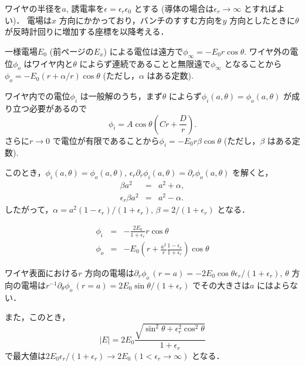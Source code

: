 \documentclass{jsarticle}
\begin{document}
ワイヤの半径を$a$, 誘電率を$\epsilon = \epsilon_r \epsilon_0$ とする (導体の場合は$\epsilon_r\to\infty$ とすればよい)．
電場は$x$ 方向にかかっており，バンチのすすむ方向を$y$ 方向としたときに$\theta$ が反時計回りに増加する座標を以降考える．

一様電場$E_0$ (前ページの$E_x$) による電位は遠方で$\phi_\infty = -E_0r\cos\theta$.
ワイヤ外の電位$\phi_o$ はワイヤ内と$\theta$ によらず連続であることと無限遠で$\phi_\infty$ となることから$\phi_o = -E_0(r + \alpha/r)\cos\theta$ (ただし，$\alpha$ はある定数).

ワイヤ内での電位$\phi_i$ は一般解のうち，まず$\theta$ によらず$\phi_i(a,\theta) = \phi_o(a,\theta)$ が成り立つ必要があるので
\begin{equation}
\phi_i = A\cos\theta (Cr + \frac{D}{r}).
\end{equation}
さらに$r\to 0$ で電位が有限であることから$\phi_i = -E_0r\beta\cos\theta$ (ただし，$\beta$ はある定数).


このとき，$\phi_i(a,\theta) = \phi_o(a,\theta)$, $\epsilon_r\partial_r\phi_i(a, \theta) = \partial_r\phi_o(a, \theta)$ を解くと，
\begin{eqnarray}
\beta a^2 &=& a^2 + \alpha, \\
\epsilon_r \beta a^2 &=& a^2 - \alpha.
\end{eqnarray}
したがって，$\alpha = a^2(1-\epsilon_r)/(1+\epsilon_r)$, $\beta = 2/(1+\epsilon_r)$ となる．

\begin{eqnarray}
\phi_i &=& - \frac{2 E_0}{1+\epsilon_r} r \cos\theta \\ 
\phi_o &=& -E_0\left(r + \frac{a^2}{r}\frac{1-\epsilon_r}{1+\epsilon_r}\right) \cos\theta
\end{eqnarray}

ワイヤ表面における$r$ 方向の電場は$\partial_r\phi_o\,(r = a) = -2E_0\cos\theta\epsilon_r/(1+\epsilon_r)$, $\theta$ 方向の電場は$r^{-1}\partial_\theta\phi_o\,(r = a) = 2E_0\sin\theta/(1+\epsilon_r)$ でその大きさは$a$ にはよらない．

また，このとき，
\begin{equation}
|E| = 2E_0\frac{\sqrt{\sin^2\theta + \epsilon_r^2\cos^2\theta}}{1 + \epsilon_r}
\end{equation}
で最大値は$2E_0\epsilon_r/(1+\epsilon_r)\to2E_0\,(1<\epsilon_r\to\infty)$ となる．
\end{document}
